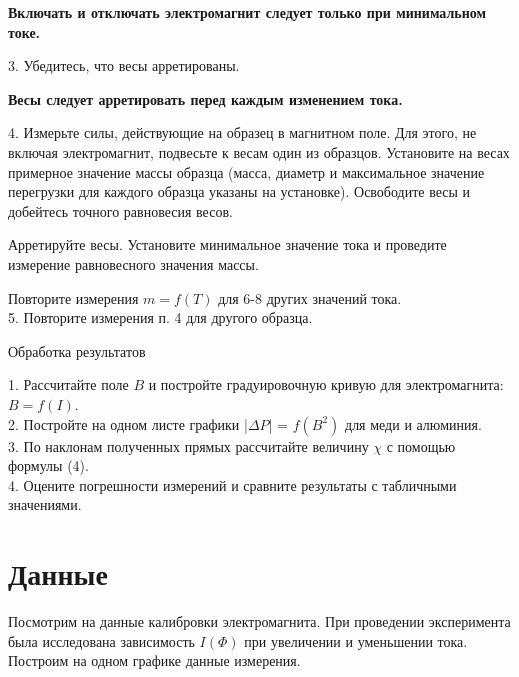 \begin{center}
    \textbf{Включать и отключать электромагнит следует только при минимальном токе.}
\end{center}
3.	Убедитесь, что весы арретированы.
\begin{center}
    \textbf{Весы следует арретировать перед каждым изменением тока.}
\end{center}
4.	Измерьте силы, действующие на образец в магнитном поле. Для этого, не включая электромагнит, подвесьте к весам один из образцов. Установите на весах примерное значение массы образца (масса, диаметр и максимальное значение перегрузки для каждого образца указаны на установке). Освободите весы и добейтесь точного равновесия весов.

Арретируйте весы. Установите минимальное значение тока и проведите измерение равновесного значения массы.

Повторите измерения $m = f(T)$ для 6-8 других значений тока.\\
5.	Повторите измерения п. 4 для другого образца.

\begin{center}
Обработка результатов
\end{center}
1. Рассчитайте поле $B$ и постройте градуировочную кривую для электромагнита: $B = f(I)$.\\
2. Постройте на одном листе графики |$\Delta{P}$| = $f(B^2)$ для меди и алюминия.\\
3. По наклонам полученных прямых рассчитайте величину $\chi$ с помощью формулы (4).\\
4. Оцените погрешности измерений и сравните результаты с табличными значениями.

\section{\label{sec:level1}Данные}

Посмотрим на данные калибровки электромагнита. При проведении эксперимента была исследована зависимость $I(\Phi)$ при увеличении и уменьшении тока. Построим на одном графике данные измерения.


